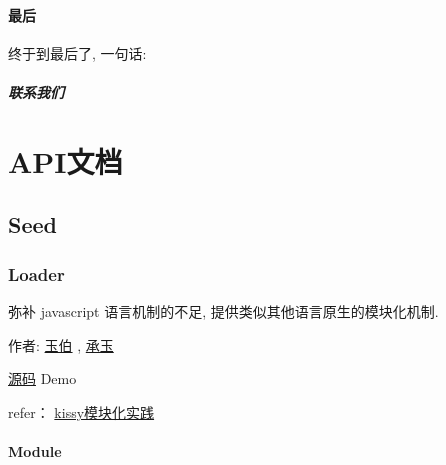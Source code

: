 \documentclass[letterpaper,10pt,english]{sphinxmanual}
\begin{document}
\subsubsection{最后}
\label{quickstart/nextstep:id4}
终于到最后了, 一句话:
\paragraph{联系我们}


\chapter{API文档}
\label{api/index:api}\label{api/index::doc}\label{api/index:id1}

\section{Seed}
\label{api/seed/index:seed}\label{api/seed/index::doc}\label{api/seed/index:id1}\label{api/seed/loader/index:module-Loader}

\subsection{Loader}
\label{api/seed/loader/index:id1}\label{api/seed/loader/index::doc}\label{api/seed/loader/index:loader}
\begin{DUlineblock}{0em}
\item[] 弥补 javascript 语言机制的不足, 提供类似其他语言原生的模块化机制.
\item[] 作者: \href{mailto:lifesinger@gmail.com}{玉伯} , \href{mailto:yiminghe@gmail.com}{承玉}
\item[] \href{https://github.com/kissyteam/kissy/tree/master/src/seed/loader}{源码}  \textbar{} Demo
\item[] refer： \href{http://goo.gl/l6atd}{kissy模块化实践}
\end{DUlineblock}


\subsubsection{Module}
\label{api/seed/loader/index:module}\begin{quote}

{\hyperref[api/seed/loader/index:module-Loader]{}}
\end{quote}
\end{document}
